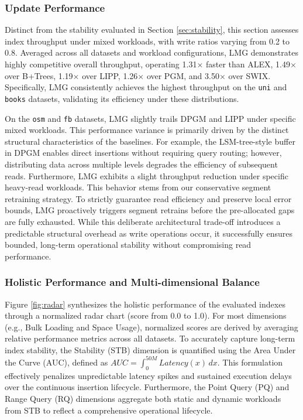 \subsubsection{Update Performance}
Distinct from the stability evaluated in Section \ref{sec:stability}, this section assesses index throughput under mixed workloads, with write ratios varying from 0.2 to 0.8. Averaged across all datasets and workload configurations, LMG demonstrates highly competitive overall throughput, operating 1.31$\times$ faster than ALEX, 1.49$\times$ over B+Trees, 1.19$\times$ over LIPP, 1.26$\times$ over PGM, and 3.50$\times$ over SWIX. Specifically, LMG consistently achieves the highest throughput on the \texttt{uni} and \texttt{books} datasets, validating its efficiency under these distributions.

On the \texttt{osm} and \texttt{fb} datasets, LMG slightly trails DPGM and LIPP under specific mixed workloads. This performance variance is primarily driven by the distinct structural characteristics of the baselines. For example, the LSM-tree-style buffer in DPGM enables direct insertions without requiring query routing; however, distributing data across multiple levels degrades the efficiency of subsequent reads. Furthermore, LMG exhibits a slight throughput reduction under specific heavy-read workloads. This behavior stems from our conservative segment retraining strategy. To strictly guarantee read efficiency and preserve local error bounds, LMG proactively triggers segment retrains before the pre-allocated gaps are fully exhausted. While this deliberate architectural trade-off introduces a predictable structural overhead as write operations occur, it successfully ensures bounded, long-term operational stability without compromising read performance.

\subsubsection{Holistic Performance and Multi-dimensional Balance}
Figure \ref{fig:radar} synthesizes the holistic performance of the evaluated indexes through a normalized radar chart (score from 0.0 to 1.0). For most dimensions (e.g., Bulk Loading and Space Usage), normalized scores are derived by averaging relative performance metrics across all datasets. To accurately capture long-term index stability, the Stability (STB) dimension is quantified using the Area Under the Curve (AUC), defined as $AUC = \int_{0}^{50M} Latency(x) \,dx$. This formulation effectively penalizes unpredictable latency spikes and sustained execution delays over the continuous insertion lifecycle. Furthermore, the Point Query (PQ) and Range Query (RQ) dimensions aggregate both static and dynamic workloads from STB to reflect a comprehensive operational lifecycle.

